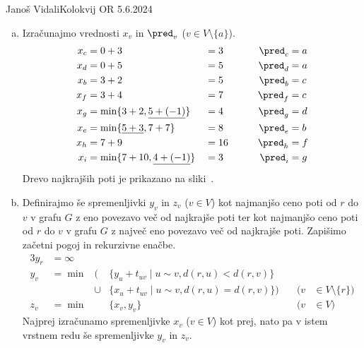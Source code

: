 \begin{naloga}{Janoš Vidali}{Kolokvij OR 5.6.2024}
\begin{odgovor}
\begin{enumerate}[(a)]
\item Izračunajmo vrednosti $x_v$ in $\pred_v$ ($v \in V \setminus \{a\}$).
\begin{alignat*}{4}
x_c &= 0 + 3 &&= 3 &\qquad \pred_c &= a \\
x_d &= 0 + 5 &&= 5 &\qquad \pred_d &= a \\
x_b &= 3 + 2 &&= 5 &\qquad \pred_b &= c \\
x_f &= 3 + 4 &&= 7 &\qquad \pred_f &= c \\
x_g &= \min\{3+2, \underline{5 + (-1)}\} &&= 4 &\qquad \pred_g &= d \\
x_e &= \min\{\underline{5+3}, 7+7\} &&= 8 &\qquad \pred_e &= b \\
x_h &= 7 + 9 &&= 16 &\qquad \pred_h &= f \\
x_i &= \min\{7+10, \underline{4 + (-1)}\} &&= 3 &\qquad \pred_i &= g
\end{alignat*}
Drevo najkrajših poti je prikazano na sliki~.
%
\begin{slika}
\end{slika}

\item Definirajmo še spremenljivki $y_v$ in $z_v$ ($v \in V$)
kot najmanjšo ceno poti od $r$ do $v$ v grafu $G$
z eno povezavo več od najkrajše poti
ter kot najmanjšo ceno poti od $r$ do $v$ v grafu $G$
z največ eno povezavo več od najkrajše poti.
Zapišimo začetni pogoj in rekurzivne enačbe.
\begin{alignat*}{3}
y_r &= \infty \\
y_v &= \min&\big(&\{y_u + t_{uv} \mid u \sim v, d(r, u) < d(r, v)\} \\
&&\cup &\{x_u + t_{uv} \mid u \sim v, d(r, u) = d(r, v)\}\big) &\quad (v &\in V \setminus \{r\}) \\
z_v &= \min&&\{x_v, y_v\} &\quad (v &\in V)
\end{alignat*}
Najprej izračunamo spremenljivke $x_v$ ($v \in V$) kot prej,
nato pa v istem vrst\-nem redu še spremenljivke $y_v$ in $z_v$.

\end{enumerate}
\end{odgovor}
\end{naloga}
